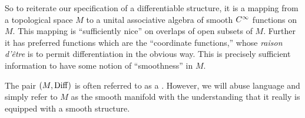 So to reiterate our specification of a differentiable structure,
it is a mapping from a topological space $M$ to a unital associative
algebra of smooth $C^{\infty}$ functions on $M$. This mapping is
``sufficiently nice'' on overlaps of open subsets of $M$. Further
it has preferred functions which are the ``coordinate functions,'' 
whose \emph{raison d'\^{e}tre} is to permit differentiation in
the obvious way. This is precisely sufficient information to have
some notion of ``smoothness'' in $M$.

\begin{rmk}
The pair $(M,{\rm Diff})$ is often referred to as a 
. However, we will abuse language and
simply refer to $M$ as the smooth manifold with the understanding
that it really is equipped with a smooth structure.
\end{rmk}
